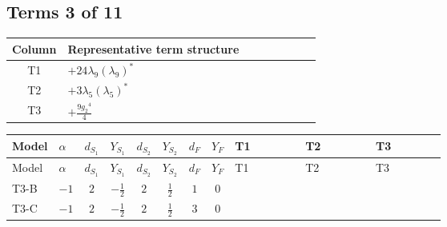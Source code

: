 \documentclass[8pt]{article}
\begin{document}
\begin{landscape}
\subsection*{Terms 3 of 11}
\begin{center}
\begin{tabular}{@{}c >{\raggedright\arraybackslash}p{0.82\linewidth}@{}}
\toprule
Column & Representative term structure \\
\midrule
T1 & \(\displaystyle +24 {\lambda_9} \left({\lambda_9}\right)^{*}\) \\
\midrule
T2 & \(\displaystyle +3 {\lambda_5} \left({\lambda_5}\right)^{*}\) \\
\midrule
T3 & \(\displaystyle +\frac{9 {g_2}^4}{4}\) \\
\midrule
\bottomrule
\end{tabular}
\end{center}
\smallskip
\tiny
\begin{longtable}{@{}llcccccc >{\raggedright\arraybackslash}p{0.21\linewidth} >{\raggedright\arraybackslash}p{0.21\linewidth} >{\raggedright\arraybackslash}p{0.21\linewidth}@{}}
\toprule
Model & $\alpha$ & $d_{S_1}$ & $Y_{S_1}$ & $d_{S_2}$ & $Y_{S_2}$ & $d_F$ & $Y_F$ & T1 & T2 & T3 \\
\midrule
\endfirsthead
\toprule
Model & $\alpha$ & $d_{S_1}$ & $Y_{S_1}$ & $d_{S_2}$ & $Y_{S_2}$ & $d_F$ & $Y_F$ & T1 & T2 & T3 \\
\midrule
\endhead
T3-B & $-1$ & $2$ & $-\frac{1}{2}$ & $2$ & $\frac{1}{2}$ & $1$ & $0$ & \scriptsize\adjustbox{max width=\linewidth}{$\begin{gathered} +24 {\lambda_9} \left({\lambda_9}\right)^{*}\end{gathered}$} & \scriptsize\adjustbox{max width=\linewidth}{$\begin{gathered} +3 {\lambda_5} \left({\lambda_5}\right)^{*}\end{gathered}$} & \scriptsize\adjustbox{max width=\linewidth}{$\begin{gathered} +\frac{9 {g_2}^4}{4}\end{gathered}$} \\
\midrule
T3-C & $-1$ & $2$ & $-\frac{1}{2}$ & $2$ & $\frac{1}{2}$ & $3$ & $0$ & \scriptsize\adjustbox{max width=\linewidth}{$\begin{gathered} +24 {\lambda_9} \left({\lambda_9}\right)^{*}\end{gathered}$} & \scriptsize\adjustbox{max width=\linewidth}{$\begin{gathered} +3 {\lambda_5} \left({\lambda_5}\right)^{*}\end{gathered}$} & \scriptsize\adjustbox{max width=\linewidth}{$\begin{gathered} +\frac{9 {g_2}^4}{4}\end{gathered}$} \\

\end{longtable}
\end{landscape}
\end{document}
